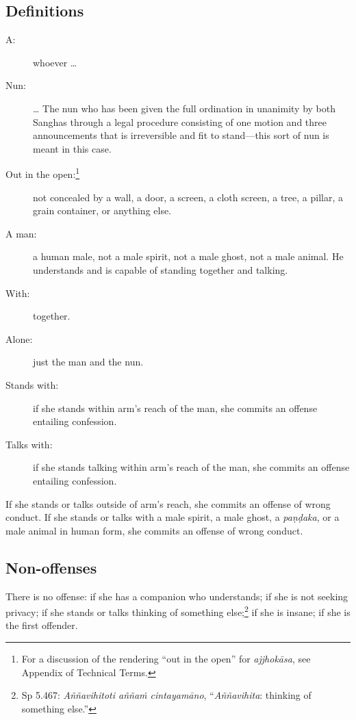\documentclass[12pt,openany]{book}%
\begin{document}
\subsection*{Definitions }

\begin{description}%
\item[A: ] whoever … %
\item[Nun: ] … The nun who has been given the full ordination in unanimity by both Sanghas through a legal procedure consisting of one motion and three announcements that is irreversible and fit to stand—this sort of nun is meant in this case. %
\item[Out in the open:\footnote{For a discussion of the rendering “out in the open” for \textit{\textsanskrit{ajjhokāsa}}, see Appendix of Technical Terms. } ] not concealed by a wall, a door, a screen, a cloth screen, a tree, a pillar, a grain container, or anything else. %
\item[A man: ] a human male, not a male spirit, not a male ghost, not a male animal. He understands and is capable of standing together and talking. %
\item[With: ] together. %
\item[Alone: ] just the man and the nun. %
\item[Stands with: ] if she stands within arm’s reach of the man, she commits an offense entailing confession. %
\item[Talks with: ] if she stands talking within arm’s reach of the man, she commits an offense entailing confession. %
\end{description}

If she stands or talks outside of arm’s reach, she commits an offense of wrong conduct. If she stands or talks with a male spirit, a male ghost, a \textit{\textsanskrit{paṇḍaka}}, or a male animal in human form, she commits an offense of wrong conduct. 

\subsection*{Non-offenses }

There is no offense: if she has a companion who understands;  if she is not seeking privacy;  if she stands or talks thinking of something else;\footnote{Sp 5.467: \textit{\textsanskrit{Aññavihitoti} \textsanskrit{aññaṁ} \textsanskrit{cintayamāno}}, “\textit{\textsanskrit{Aññavihita}}: thinking of something else.” }  if she is insane;  if she is the first offender. 
\end{document}
